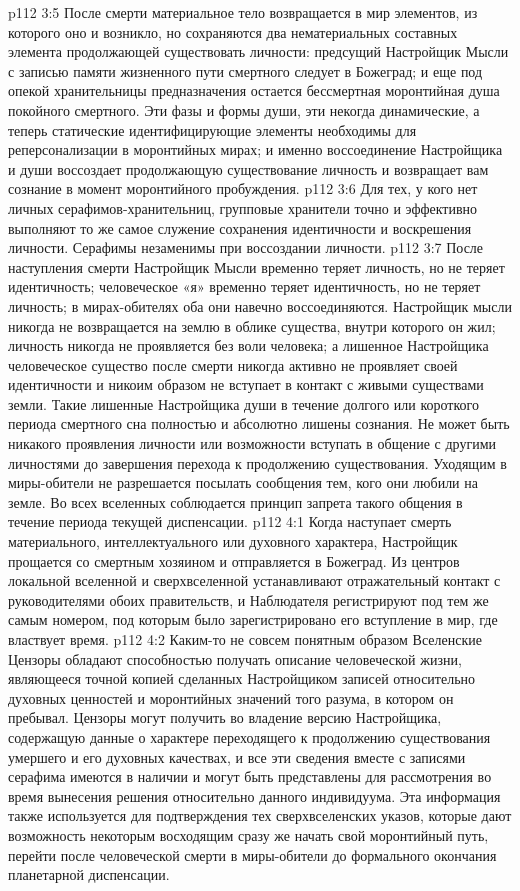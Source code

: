 \vs p112 3:5 \pc После смерти материальное тело возвращается в мир элементов, из которого оно и возникло, но сохраняются два нематериальных составных элемента продолжающей существовать личности: предсущий Настройщик Мысли с записью памяти жизненного пути смертного следует в Божеград; и еще под опекой хранительницы предназначения остается бессмертная моронтийная душа покойного смертного. Эти фазы и формы души, эти некогда динамические, а теперь статические идентифицирующие элементы необходимы для реперсонализации в моронтийных мирах; и именно воссоединение Настройщика и души воссоздает продолжающую существование личность и возвращает вам сознание в момент моронтийного пробуждения.
\vs p112 3:6 Для тех, у кого нет личных серафимов\hyp{}хранительниц, групповые хранители точно и эффективно выполняют то же самое служение сохранения идентичности и воскрешения личности. Серафимы незаменимы при воссоздании личности.
\vs p112 3:7 После наступления смерти Настройщик Мысли временно теряет личность, но не теряет идентичность; человеческое «я» временно теряет идентичность, но не теряет личность; в мирах\hyp{}обителях оба они навечно воссоединяются. Настройщик мысли никогда не возвращается на землю в облике существа, внутри которого он жил; личность никогда не проявляется без воли человека; а лишенное Настройщика человеческое существо после смерти никогда активно не проявляет своей идентичности и никоим образом не вступает в контакт с живыми существами земли. Такие лишенные Настройщика души в течение долгого или короткого периода смертного сна полностью и абсолютно лишены сознания. Не может быть никакого проявления личности или возможности вступать в общение с другими личностями до завершения перехода к продолжению существования. Уходящим в миры\hyp{}обители не разрешается посылать сообщения тем, кого они любили на земле. Во всех вселенных соблюдается принцип запрета такого общения в течение периода текущей диспенсации.
\vs p112 4:1 Когда наступает смерть материального, интеллектуального или духовного характера, Настройщик прощается со смертным хозяином и отправляется в Божеград. Из центров локальной вселенной и сверхвселенной устанавливают отражательный контакт с руководителями обоих правительств, и Наблюдателя регистрируют под тем же самым номером, под которым было зарегистрировано его вступление в мир, где властвует время.
\vs p112 4:2 Каким\hyp{}то не совсем понятным образом Вселенские Цензоры обладают способностью получать описание человеческой жизни, являющееся точной копией сделанных Настройщиком записей относительно духовных ценностей и моронтийных значений того разума, в котором он пребывал. Цензоры могут получить во владение версию Настройщика, содержащую данные о характере переходящего к продолжению существования умершего и его духовных качествах, и все эти сведения вместе с записями серафима имеются в наличии и могут быть представлены для рассмотрения во время вынесения решения относительно данного индивидуума. Эта информация также используется для подтверждения тех сверхвселенских указов, которые дают возможность некоторым восходящим сразу же начать свой моронтийный путь, перейти после человеческой смерти в миры\hyp{}обители до формального окончания планетарной диспенсации.
